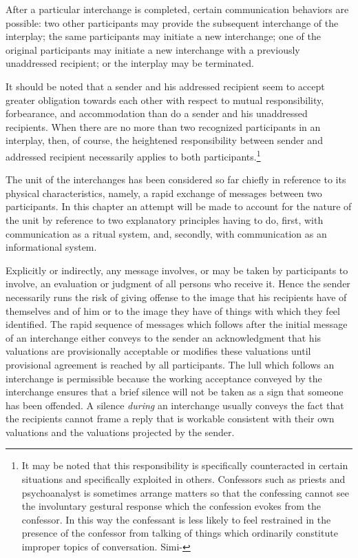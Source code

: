 \documentclass[openany,nobib]{tufte-book}
\begin{document}
After a particular interchange is completed, certain communication
behaviors are possible: two other participants may provide the
subsequent interchange of the interplay; the same participants may
initiate a new interchange; one of the original participants may
initiate a new interchange with a previously unaddressed recipient; or
the interplay may be terminated.

It should be noted that a sender and his addressed recipient seem to
accept greater obligation towards each other with respect to mutual
responsibility, forbearance, and accommodation than do a sender and his
unaddressed recipients. When there are no more than two recognized
participants in an interplay, then, of course, the heightened
responsibility between sender and addressed recipient necessarily
applies to both participants.\footnote{It may be noted that this
  responsibility is specifically counteracted in certain situations and
  specifically exploited in others. Confessors such as priests and
  psychoanalyst is sometimes arrange matters so that the confessing
  cannot see the involuntary gestural response which the confession
  evokes from the confessor. In this way the confessant is less likely
  to feel restrained in the presence of the confessor from talking of
  things which ordinarily constitute improper topics of conversation.
  Simi-}

The unit of the interchanges has been considered so far chiefly in
reference to its physical characteristics, namely, a rapid exchange of
messages between two participants. In this chapter an attempt will be
made to account for the nature of the unit by reference to two
explanatory principles having to do, first, with communication as a
ritual system, and, secondly, with communication as an informational
system.

\newpage Explicitly or indirectly, any message involves, or may be taken by
participants to involve, an evaluation or judgment of all persons who
receive it. Hence the sender necessarily runs the risk of giving offense
to the image that his recipients have of themselves and of him or to the
image they have of things with which they feel identified. The rapid
sequence of messages which follows after the initial message of an
interchange either conveys to the sender an acknowledgment that his
valuations are provisionally acceptable or modifies these valuations
until provisional agreement is reached by all participants. The lull
which follows an interchange is permissible because the working
acceptance conveyed by the interchange ensures that a brief silence will
not be taken as a sign that someone has been offended. A silence
\emph{during} an interchange usually conveys the fact that the
recipients cannot frame a reply that is workable consistent with their
own valuations and the valuations projected by the sender.
\end{document}
